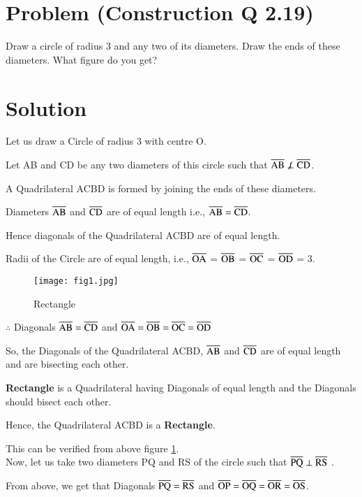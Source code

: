 \documentclass[journal,12pt,twocolumn]{IEEEtran}
\begin{document}
\section*{\textbf{Problem (Construction Q 2.19)}}
Draw a circle of radius 3 and any two of its diameters. Draw the ends of these diameters. What figure do you get?
\section*{\textbf{Solution}}
Let us draw a Circle of radius 3 with centre O.

Let AB and CD be any two diameters of this circle such that $\overline{\rm AB} \not \perp \overline{\rm CD}$. 

A Quadrilateral ACBD is formed by joining the ends of these diameters.

Diameters $\overline{\rm AB}$ and $\overline{\rm CD}$ are of equal length i.e., $\overline{\rm AB} = \overline{\rm CD}$.

Hence diagonals of the Quadrilateral ACBD are of equal length.

Radii of the Circle are of equal length, i.e., $\overline{\rm OA}$ = $\overline{\rm OB}$ = $\overline{\rm OC}$ = $\overline{\rm OD}$ = 3.

\begin{figure}[!h]
\centering
\texttt{[image: fig1.jpg]}
\caption{Rectangle}
\label{rectangle}
\end{figure}

$\therefore$ Diagonals $\overline{\rm AB} = \overline{\rm CD}$ and  $\overline{\rm OA} = \overline{\rm OB} = \overline{\rm OC} = \overline{\rm OD}$

So, the Diagonals of the Quadrilateral ACBD, $\overline{\rm AB}$ and $\overline{\rm CD}$ are of equal length and are bisecting each other.

\textbf{Rectangle} is a Quadrilateral having Diagonals of equal length and the Diagonals should bisect each other.

Hence, the Quadrilateral ACBD is a \textbf{Rectangle}. 

This can be verified from above figure \ref{rectangle}. \\

Now, let us take two diameters PQ and RS of the circle such that $\overline{\rm PQ} \perp \overline{\rm RS}$ .

From above, we get that Diagonals $\overline{\rm PQ} = \overline{\rm RS}$ and  $\overline{\rm OP} = \overline{\rm OQ} = \overline{\rm OR} = \overline{\rm OS}$.
\end{document}
